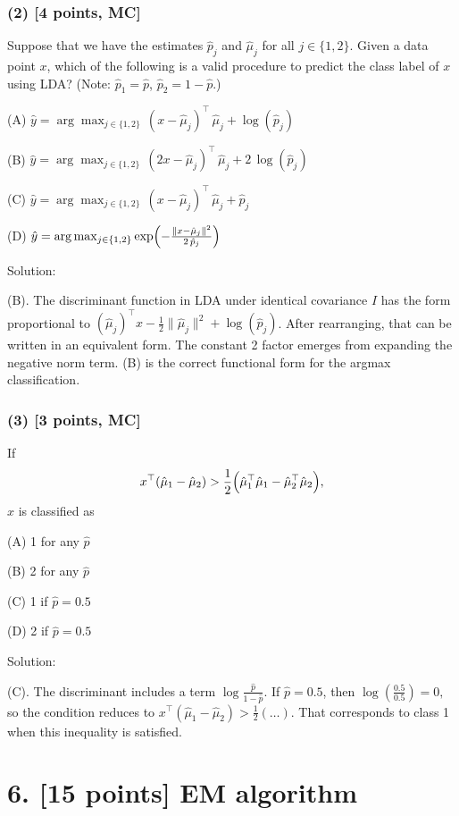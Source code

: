 \documentclass[twocolumn]{article}
\begin{document}
\begin{spacing}{1}
\subsubsection*{(2) [4 points, MC]}
Suppose that we have the estimates \(\hat{p}_j\) and \(\hat{\mu}_j\) for all \(j\in\{1,2\}\). Given a data point \(x\), which of the following is a valid procedure to predict the class label of \(x\) using LDA? (Note: \(\hat{p}_1=\hat{p}\), \(\hat{p}_2=1-\hat{p}\).)

(A) \(\hat{y} = \arg\max_{j\in\{1,2\}}\,(x-\hat{\mu}_j)^\top \,\hat{\mu}_j + \log(\hat{p}_j)\)

(B) \(\hat{y} = \arg\max_{j\in\{1,2\}}\,(2x-\hat{\mu}_j)^\top \,\hat{\mu}_j + 2\,\log(\hat{p}_j)\)

(C) \(\hat{y} = \arg\max_{j\in\{1,2\}}\,(x-\hat{\mu}_j)^\top \,\hat{\mu}_j + \hat{p}_j\)

(D) \(\hat{y} = \arg\max_{j\in\{1,2\}}\exp\Bigl(-\frac{\|x-\hat{\mu}_j\|^2}{2\,\hat{p}_j}\Bigr)\)

Solution:

(B). The discriminant function in LDA under identical covariance \(I\) has the form proportional to \((\hat{\mu}_j)^\top x - \tfrac12 \|\hat{\mu}_j\|^2 + \log(\hat{p}_j)\). After rearranging, that can be written in an equivalent form. The constant 2 factor emerges from expanding the negative norm term. (B) is the correct functional form for the argmax classification.

\subsubsection*{(3) [3 points, MC]}
If
\[
x^\top(\hat{\mu}_1 - \hat{\mu}_2) > \frac12 \Bigl(\hat{\mu}_1^\top \hat{\mu}_1 - \hat{\mu}_2^\top \hat{\mu}_2\Bigr),
\]
\(x\) is classified as

(A) 1 for any \(\hat{p}\)

(B) 2 for any \(\hat{p}\)

(C) 1 if \(\hat{p}=0.5\)

(D) 2 if \(\hat{p}=0.5\)

Solution:

(C). The discriminant includes a term \(\log\frac{\hat{p}}{1-\hat{p}}\). If \(\hat{p}=0.5\), then \(\log(\frac{0.5}{0.5})=0,\) so the condition reduces to \(x^\top(\hat{\mu}_1 - \hat{\mu}_2) > \frac12(\ldots)\). That corresponds to class 1 when this inequality is satisfied.

\bigskip

\section{6. [15 points] EM algorithm}


\end{spacing}
\end{document}
